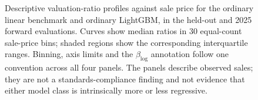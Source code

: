 \begin{figure}[!htbp]
\centering
{}
\caption{Descriptive valuation-ratio profiles against sale price for the ordinary linear
benchmark and ordinary LightGBM, in the held-out and 2025 forward evaluations. Curves show
median ratios in 30 equal-count sale-price bins; shaded regions show the corresponding
interquartile ranges. Binning, axis limits and the $\beta_{\log}$ annotation follow one
convention across all four panels. The panels describe observed sales; they are not a
standards-compliance finding and not evidence that either model class is intrinsically more
or less regressive.}
\label{fig:baseline_motivation}
\end{figure}

